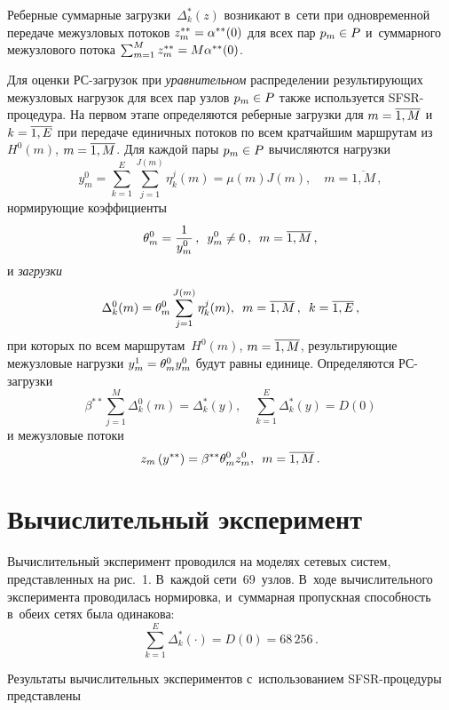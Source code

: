 \begin{multicols}{2}
Реберные суммарные загрузки~$\Delta_k^{*}(z)$ возникают в~сети при одновременной передаче  межузловых потоков
$ z_m^{**} \hm= \alpha^{**}(0)$ для всех пар $p_m \hm\in P$ и~суммарного межузлового 
потока $\sum\nolimits_{m=1}^{M} z_m^{**} \hm= M \alpha^{**}(0)$.

Для оценки РС-за\-гру\-зок при \textit{уравнительном } рас\-пре\-де\-ле\-нии ре\-зуль\-ти\-ру\-ющих 
межузловых на\-гру\-зок для всех пар уз\-лов $p_m \hm\in P$  так\-же используется SFSR-про\-це\-ду\-ра. 
На первом этапе определяются ре\-бер\-ные за\-груз\-ки для $m\hm = \overline{1, M}$ и~$k \hm= \overline{1, E}$ 
при передаче единичных потоков по всем крат\-чай\-шим марш\-ру\-там из~$H^0(m)$, $m \hm= \overline{1, M}$. 
Для каж\-дой пары $p_m \hm\in P$ вы\-чис\-ля\-ют\-ся на\-грузки
$$ 
y_m^0 = \sum\limits_{k=1}^{E} \sum\limits_{j=1}^{J(m)} \eta_k^j(m) = \mu(m)J(m), \quad m = \overline{1, M}\,, 
$$
нормирующие коэффициенты
$$
 \theta_m^0 = \displaystyle\frac{\displaystyle 1\mathstrut}{\displaystyle y_m^0\mathstrut}\,,\enskip  y_m^0 \not = 0\,,\enskip  m = \overline{1, M}\,,
 $$
и \textit{загрузки}
$$
\Delta_k^0(m) = \theta_m^0 \sum\limits_{j=1}^{J(m)} \eta_k^j(m), \enskip  m = \overline{1, M}\,, \enskip 
k =\overline{1, E}\,,
$$
при которых по всем марш\-ру\-там~$H^0(m)$, $m \hm= \overline{1, M}$, ре\-зуль\-ти\-ру\-ющие 
межузловые нагрузки $y_m^1 \hm= \theta_m^0 y_m^0$ будут рав\-ны единице. Определяются РС-за\-грузки
$$
\beta^{**}  \sum\limits_{j=1}^{M} \Delta_k^0(m) = \Delta_k^{*}(y), \quad
 \sum\limits_{k=1}^{E}  \Delta_k^{*}(y) = D(0) 
 $$
и межузловые потоки
$$
z_m\left(y^{**}\right) = \beta^{**}\theta_m^0 z_{m}^0,\enskip m = \overline{1, M}\,.
$$ 



   
\section{Вычислительный эксперимент}

Вычислительный эксперимент проводился на моделях сетевых сис\-тем, пред\-став\-лен\-ных 
на рис.~1. В~каж\-дой сети~69~узлов. В~ходе вы\-чис\-ли\-тель\-но\-го эксперимента 
проводилась нормировка, и~суммарная про\-пуск\-ная спо\-соб\-ность в~обеих сетях была 
оди\-на\-кова:
$$
\sum\limits_{k=1}^{E} \Delta_k^*(\cdot) = D(0)= 68\,256\,.
$$

Результаты вычислительных экспериментов с~использованием SFSR-про\-це\-ду\-ры 
пред\-став\-ле\-ны\linebreak\vspace*{-12pt}

\pagebreak

\end{multicols}

